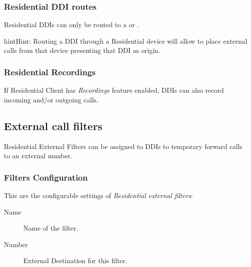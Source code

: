\documentclass[letterpaper,10pt,english]{sphinxmanual}
\begin{document}
\subsubsection{Residential DDI routes}
\label{administration_portal/client/residential/ddis:residential-ddi-routes}
Residential DDIs can only be routed to a {\hyperref[administration_portal/client/residential/residential_devices:residential\string-devices]{}}
or {\hyperref[administration_portal/client/vpbx/faxes:faxing\string-system]{}}.

\begin{notice}{hint}{Hint:}
Routing a DDI through a Residential device will allow to place external calls
from that device presenting that DDI as origin.
\end{notice}


\subsubsection{Residential Recordings}
\label{administration_portal/client/residential/ddis:residential-recordings}
If Residential Client has \emph{Recordings} feature enabled, DDIs can also record incoming and/or
outgoing calls.


\subsection{External call filters}
\label{administration_portal/client/residential/external_call_filters:external-call-filters}\label{administration_portal/client/residential/external_call_filters:residential-filters}\label{administration_portal/client/residential/external_call_filters::doc}
Residential External Filters can be assigned to DDIs to temporary
forward calls to an external number.


\subsubsection{Filters Configuration}
\label{administration_portal/client/residential/external_call_filters:filters-configuration}
This are the configurable settings of \emph{Residential external filters}:
\begin{description}
\item[{Name}] \leavevmode{}\label{administration_portal/client/residential/external_call_filters:term-name}
Name of the filter.

\item[{Number}] \leavevmode{}\label{administration_portal/client/residential/external_call_filters:term-number}
External Destination for this filter.

\end{description}
\end{document}

